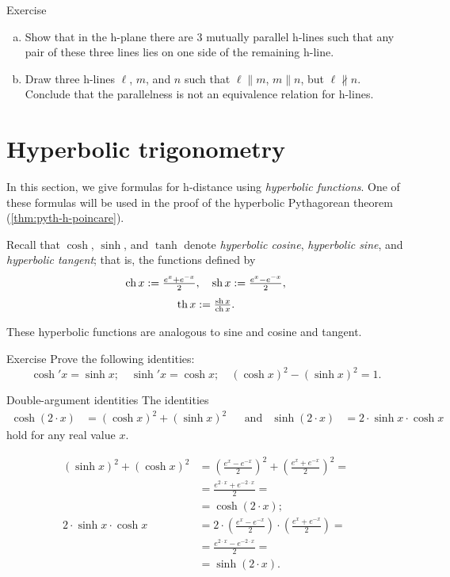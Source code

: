 \begin{thm}{Exercise}\label{ex:3-h-lines}
\begin{enumerate}[(a)]
\item Show that in the h-plane there are 3 mutually parallel h-lines 
such that any pair of these three lines lies on one side of the remaining h-line.
\item Draw three h-lines $\ell$, $m$, and $n$ such that $\ell\parallel m$, $m\parallel n$, but $\ell\nparallel n$.
Conclude that the parallelness is not an equivalence relation for h-lines.
\end{enumerate}
\end{thm}
 
\section{Hyperbolic trigonometry}
\label{sec:hyp-trig}


In this section, we give formulas for h-distance using \emph{hyperbolic functions}.
One of these formulas will be used in the proof of the hyperbolic Pythagorean theorem (\ref{thm:pyth-h-poincare}).

Recall that $\cosh$, $\sinh$, and $\tanh$ denote \emph{hyperbolic cosine}, \emph{hyperbolic sine}, and \emph{hyperbolic tangent}\label{hyperbolic tangent};
that is, the functions defined by
\[\operatorname{ch} x:= \tfrac{e^x+e^{-x}}2,
 \quad
 \operatorname{sh} x:= \tfrac{e^x-e^{-x}}2,
\]
\[\operatorname{th} x:= \tfrac{\operatorname{sh} x}{\operatorname{ch} x}.
\]

These hyperbolic functions are analogous to sine and cosine and tangent. 

\begin{thm}{Exercise}\label{ex:hyp-fun}
Prove the following identities:
\[\cosh' x=\sinh x;\quad \sinh'x=\cosh x;\quad (\cosh x)^2-(\sinh x)^2=1.\]
\end{thm}

\begin{thm}{Double-argument identities}\label{double-argument}
The identities
\begin{align*}
\cosh (2\cdot x)&=(\cosh x)^2+(\sinh x)^2 
&&\text{and}&
\sinh (2\cdot x)&=2\cdot\sinh x\cdot \cosh x
\end{align*}
hold for any real value $x$.
\end{thm}

\begin{align*}
(\sinh x)^2+(\cosh x)^2
&=(\tfrac{e^x-e^{-x}}2)^2+(\tfrac{e^x+e^{-x}}2)^2=
\\
&=\tfrac{e^{2\cdot x}+e^{-2\cdot x}}2=
\\
&=\cosh (2\cdot x);
\\
2\cdot\sinh x\cdot \cosh x
&=2\cdot(\tfrac{e^x-e^{-x}}2)\cdot(\tfrac{e^x+e^{-x}}2)=
\\
&=\tfrac{e^{2\cdot x}-e^{-2\cdot x}}2=
\\
&=\sinh (2\cdot x).
\end{align*}
\qedsf

